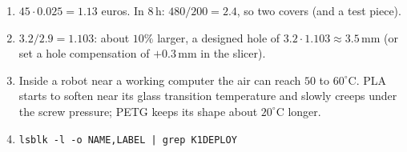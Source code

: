 \begin{enumerate}[label=\textbf{\ansnum.\arabic*}]
  \item $45\cdot0.025=1.13$ euros. In $8$\,h: $480/200=2.4$, so two covers (and a test piece).
  \item $3.2/2.9=1.103$: about $10\%$ larger, a designed hole of $3.2\cdot1.103\approx3.5$\,mm (or set a hole compensation of $+0.3$\,mm in the slicer).
  \item Inside a robot near a working computer the air can reach $50$ to $60^\circ$C. PLA starts to soften near its glass transition temperature and slowly creeps under the screw pressure; PETG keeps its shape about $20^\circ$C longer.
  \item \verb!lsblk -l -o NAME,LABEL | grep K1DEPLOY!
\end{enumerate}
